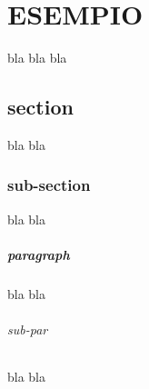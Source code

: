 


\chapter{ESEMPIO}
bla bla bla
 \section{section}
 	bla bla 
 	\subsection{sub-section}
      bla bla 
      \paragraph{paragraph}
      	bla bla
      	\subparagraph{sub-par}
			bla bla 